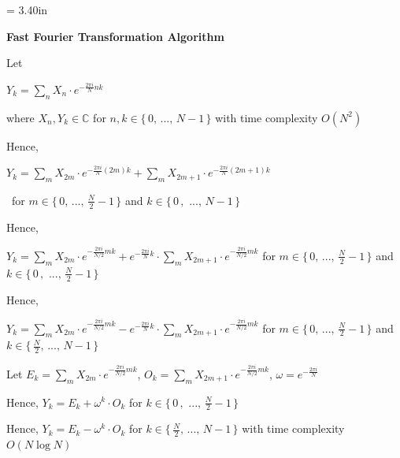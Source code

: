 \documentclass[a4paper,12pt]{article}
\begin{document}
\newpage\thispagestyle{empty}\pdfpageheight = 3.40in\enlargethispage{100in}

\textbf{\large Fast Fourier Transformation Algorithm}

\bigskip

Let\begin{lalign}
    $Y_k = \sum_n X_n \cdot e^{-\frac{2\pi i}{N}nk}$
\end{lalign}
where $X_n, Y_k \in \mathbb{C}$ for $n, k \in \{\,0,\,...,\,N - 1\,\}$ with time complexity $O(N^2)$

\bigskip

Hence,\begin{lalign}
    $Y_k = \sum_m X_{2m} \cdot e^{-\frac{2\pi i}{N}(2m)k} + \sum_m X_{2m+1} \cdot e^{-\frac{2\pi i}{N}(2m+1)k}$
\end{lalign}
\,\,\,for $m \in \{\,0,\,...,\,\frac{N}{2} - 1\,\}$ and $k \in \{\,0\,,\,\,...,\,N - 1\,\}$

\bigskip

Hence,\begin{lalign}
    $Y_k = {\sum_m X_{2m} \cdot e^{-\frac{2\pi i}{N/2} mk}} + e^{-\frac{2\pi i}{N}k} \cdot \sum_m X_{2m+1} \cdot e^{-\frac{2\pi i}{N/2} mk}$ for $m \in \{\,0,\,...,\,\frac{N}{2} - 1\,\}$ and $k \in \{\,0\,,\,\,...,\,\frac{N}{2} - 1\,\}$
\end{lalign}

\bigskip

Hence,\begin{lalign}
    $Y_k = \sum_m X_{2m} \cdot e^{-\frac{2\pi i}{N/2}mk} - e^{-\frac{2\pi i}{N}k} \cdot \sum_m X_{2m+1} \cdot e^{-\frac{2\pi i}{N/2} mk}$ for $m \in \{\,0,\,...,\,\frac{N}{2} - 1\,\}$ and $k \in \{\,\frac{N}{2},\,...,\,N - 1\,\}$
\end{lalign}

\bigskip

Let $E_k = \sum_m X_{2m} \cdot e^{-\frac{2\pi i}{N/2}mk}$, $O_k = \sum_m X_{2m+1} \cdot e^{-\frac{2\pi i}{N/2} mk}$, $\omega = e^{-\frac{2\pi i}{N}}$

\bigskip

Hence, $Y_k = E_k + \omega^k \cdot O_k$ for $k \in \{\,0\,,\,\,...,\,\frac{N}{2} - 1\,\}$

\bigskip

Hence, $Y_k = E_k - \omega^k \cdot O_k$ for $k \in \{\,\frac{N}{2},\,...,\,N - 1\,\}$ with time complexity $O(N \log N)$
\end{document}
